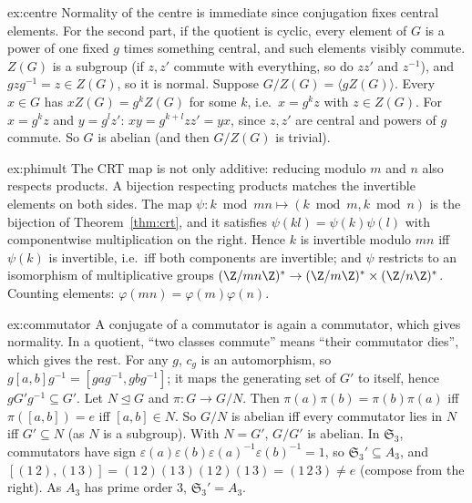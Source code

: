 \begin{solution}{ex:centre}
\idea Normality of the centre is immediate since conjugation fixes central elements. For the second part, if the quotient is cyclic, every element of $G$ is a power of one fixed $g$ times something central, and such elements visibly commute.
\writeup $Z(G)$ is a subgroup (if $z,z'$ commute with everything, so do $zz'$ and $z^{-1}$), and $gzg^{-1}=z\in Z(G)$, so it is normal. Suppose $G/Z(G)=\langle gZ(G)\rangle$. Every $x\in G$ has $xZ(G)=g^kZ(G)$ for some $k$, i.e.\ $x=g^kz$ with $z\in Z(G)$. For $x=g^kz$ and $y=g^lz'$: $xy=g^{k+l}zz'=yx$, since $z,z'$ are central and powers of $g$ commute. So $G$ is abelian (and then $G/Z(G)$ is trivial).
\end{solution}

\begin{solution}{ex:phimult}
\idea The CRT map is not only additive: reducing modulo $m$ and $n$ also respects products. A bijection respecting products matches the invertible elements on both sides.
\writeup The map $\psi:k\bmod mn\mapsto(k\bmod m,k\bmod n)$ is the bijection of Theorem~\ref{thm:crt}, and it satisfies $\psi(kl)=\psi(k)\psi(l)$ with componentwise multiplication on the right. Hence $k$ is invertible modulo $mn$ iff $\psi(k)$ is invertible, i.e.\ iff both components are invertible; and $\psi$ restricts to an isomorphism of multiplicative groups $(\Z/mn\Z)^*\to(\Z/m\Z)^*\times(\Z/n\Z)^*$. Counting elements: $\varphi(mn)=\varphi(m)\varphi(n)$.
\end{solution}

\begin{solution}{ex:commutator}
\idea A conjugate of a commutator is again a commutator, which gives normality. In a quotient, ``two classes commute'' means ``their commutator dies'', which gives the rest.
\writeup For any $g$, $c_g$ is an automorphism, so $g[a,b]g^{-1}=[gag^{-1},gbg^{-1}]$; it maps the generating set of $G'$ to itself, hence $gG'g^{-1}\subseteq G'$. Let $N\trianglelefteq G$ and $\pi:G\to G/N$. Then $\pi(a)\pi(b)=\pi(b)\pi(a)$ iff $\pi([a,b])=e$ iff $[a,b]\in N$. So $G/N$ is abelian iff every commutator lies in $N$ iff $G'\subseteq N$ (as $N$ is a subgroup). With $N=G'$, $G/G'$ is abelian.
In $\mathfrak S_3$, commutators have sign $\varepsilon(a)\varepsilon(b)\varepsilon(a)^{-1}\varepsilon(b)^{-1}=1$, so $\mathfrak S_3'\subseteq A_3$, and $[(1\,2),(1\,3)]=(1\,2)(1\,3)(1\,2)(1\,3)=(1\,2\,3)\ne e$ (compose from the right). As $A_3$ has prime order $3$, $\mathfrak S_3'=A_3$.
\end{solution}

